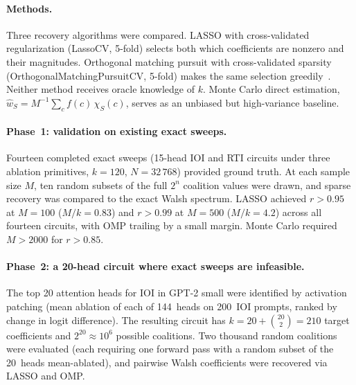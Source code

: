 \documentclass{article}
\begin{document}
\paragraph{Methods.}

Three recovery algorithms were compared. LASSO with cross-validated
regularization (LassoCV, 5-fold) selects both which coefficients are nonzero
and their magnitudes. Orthogonal matching pursuit with cross-validated
sparsity (OrthogonalMatchingPursuitCV, 5-fold) makes the same selection
greedily~\citep{tropp2007signal}. Neither method receives oracle
knowledge of $k$. Monte Carlo
direct estimation, $\hat{w}_S = M^{-1} \sum_c f(c)\, \chi_S(c)$, serves as
an unbiased but high-variance baseline.

\paragraph{Phase~1: validation on existing exact sweeps.}

Fourteen completed exact sweeps (15-head IOI and RTI circuits under three
ablation primitives, $k = 120$, $N = 32\,768$) provided ground truth. At
each sample size $M$, ten random subsets of the full $2^n$ coalition values
were drawn, and sparse recovery was compared to the exact Walsh spectrum.
LASSO achieved $r > 0.95$ at $M = 100$ ($M/k = 0.83$) and $r > 0.99$ at
$M = 500$ ($M/k = 4.2$) across all fourteen circuits, with OMP trailing by
a small margin. Monte Carlo required $M > 2000$ for $r > 0.85$.

\paragraph{Phase~2: a 20-head circuit where exact sweeps are infeasible.}

The top 20 attention heads for IOI in GPT-2 small were identified by
activation patching (mean ablation of each of 144~heads on 200~IOI prompts,
ranked by change in logit difference). The resulting circuit has
$k = 20 + \binom{20}{2} = 210$ target coefficients and $2^{20} \approx 10^6$
possible coalitions. Two thousand random coalitions were evaluated (each
requiring one forward pass with a random subset of the 20~heads mean-ablated),
and pairwise Walsh coefficients were recovered via LASSO and OMP.

\medskip
\end{document}
